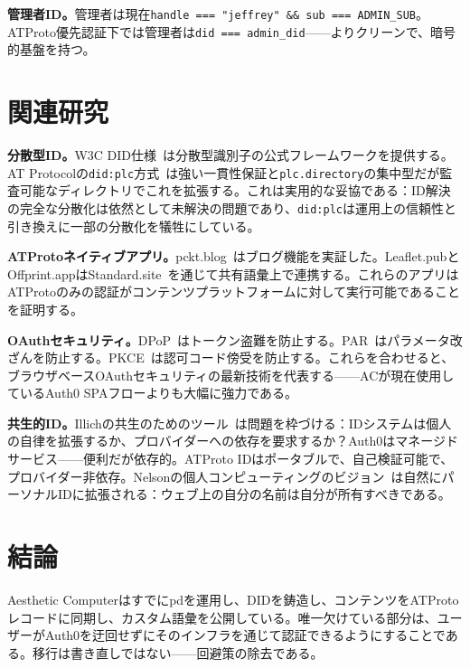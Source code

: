 \documentclass[10pt,letterpaper,twocolumn]{article}
\begin{document}
\textbf{管理者ID。}管理者は現在\texttt{handle === "jeffrey" \&\& sub === ADMIN\_SUB}。ATProto優先認証下では管理者は\texttt{did === admin\_did}——よりクリーンで、暗号的基盤を持つ。


\section{関連研究}
\label{sec:related}

\textbf{分散型ID。}W3C DID仕様~\citep{w3cdid2022}は分散型識別子の公式フレームワークを提供する。AT Protocolの\texttt{did:plc}方式~\citep{atproto2024did}は強い一貫性保証と\texttt{plc.directory}の集中型だが監査可能なディレクトリでこれを拡張する。これは実用的な妥協である：ID解決の完全な分散化は依然として未解決の問題であり、\texttt{did:plc}は運用上の信頼性と引き換えに一部の分散化を犠牲にしている。

\textbf{ATProtoネイティブアプリ。}pckt.blog~\citep{pcktblog2025}はブログ機能を実証した。Leaflet.pubとOffprint.appはStandard.site~\citep{standardsite2025}を通じて共有語彙上で連携する。これらのアプリはATProtoのみの認証がコンテンツプラットフォームに対して実行可能であることを証明する。

\textbf{OAuthセキュリティ。}DPoP~\citep{rfc9449dpop}はトークン盗難を防止する。PAR~\citep{rfc9126par}はパラメータ改ざんを防止する。PKCE~\citep{rfc7636pkce}は認可コード傍受を防止する。これらを合わせると、ブラウザベースOAuthセキュリティの最新技術を代表する——ACが現在使用しているAuth0 SPAフローよりも大幅に強力である。

\textbf{共生的ID。}Illichの共生のためのツール~\citep{illich1973tools}は問題を枠づける：IDシステムは個人の自律を拡張するか、プロバイダーへの依存を要求するか？Auth0はマネージドサービス——便利だが依存的。ATProto IDはポータブルで、自己検証可能で、プロバイダー非依存。Nelsonの個人コンピューティングのビジョン~\citep{nelson1974computerlib}は自然にパーソナルIDに拡張される：ウェブ上の自分の名前は自分が所有すべきである。


\section{結論}

Aesthetic Computerはすでにpdを運用し、DIDを鋳造し、コンテンツをATProtoレコードに同期し、カスタム語彙を公開している。唯一欠けている部分は、ユーザーがAuth0を迂回せずにそのインフラを通じて認証できるようにすることである。移行は書き直しではない——回避策の除去である。
\end{document}
